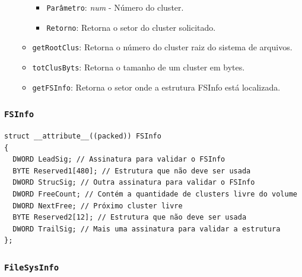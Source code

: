 \documentclass[
    12pt,				%
    oneside,   	        %
    a4paper,			%
    english,			%
    french,				%
    spanish,			%
    brazil,				%
    ]{pacotes/abntex2}
\begin{document}
\begin{itemize}
\begin{itemize}
\begin{itemize}
                \item \texttt{Parâmetro}: \textit{num} - Número do cluster.
                \item \texttt{Retorno}: Retorna o setor do cluster solicitado.
            \end{itemize}
            \item \texttt{getRootClus}: Retorna o número do cluster raiz do sistema de arquivos.
            \item \texttt{totClusByts}: Retorna o tamanho de um cluster em bytes.
            \item \texttt{getFSInfo}: Retorna o setor onde a estrutura FSInfo está localizada.
        \end{itemize}
\end{itemize}


\subsubsection{\texttt{FSInfo}}
\label{subsubsec:fsinfo}

\begin{lstlisting}[caption={Estrutura que representa o FSInfo encontrado no volume FAT}, label={lst:fsinfo}]
struct __attribute__((packed)) FSInfo
{
  DWORD LeadSig; // Assinatura para validar o FSInfo
  BYTE Reserved1[480]; // Estrutura que não deve ser usada
  DWORD StrucSig; // Outra assinatura para validar o FSInfo
  DWORD FreeCount; // Contém a quantidade de clusters livre do volume
  DWORD NextFree; // Próximo cluster livre
  BYTE Reserved2[12]; // Estrutura que não deve ser usada
  DWORD TrailSig; // Mais uma assinatura para validar a estrutura
};
\end{lstlisting}

\subsubsection{\texttt{FileSysInfo}}
\label{subsubsec:file_sys_info}
\end{document}
